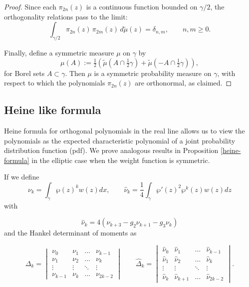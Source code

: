 \documentclass[11pt,a4paper]{article}
\theoremstyle{definition}
\numberwithin{equation}{section}
\numberwithin{theorem}{section}
\newcommand{\myrmk}[2]{\begin{quote}\fbox{\begin{minipage}{\linewidth}\small \noindent{\color{red}\bf #2:} #1{\color{red}}\end{minipage}}\end{quote}}
\newcommand{\rmkH}[1]{\myrmk{#1}{HD}}
\newcommand{\rmkS}[1]{\myrmk{#1}{SL}}
\begin{document}
\begin{proof}
Since each \( \pi_{2n}(z) \) is a continuous function bounded on \( \gamma/2 \), the orthogonality relations pass to the limit:
\[
\int_{\gamma/2}  \pi_{2n}(z)\, \pi_{2m}(z) \, d\tilde{\mu}(z) = \delta_{n,m}, \qquad n,m \geq 0.
\]

Finally, define a symmetric measure \( \mu \) on \( \gamma \) by
\[
\mu(A) := \tfrac{1}{2} \left( \tilde{\mu}(A \cap \tfrac{1}{2}\gamma) + \tilde{\mu}(-A \cap \tfrac{1}{2}\gamma) \right),
\]
for Borel sets \( A \subset \gamma \). Then \( \mu \) is a symmetric probability measure on \( \gamma \), with respect to which the polynomials \( \pi_{2n}(z) \) are orthonormal, as claimed.
\end{proof}






\subsection{Heine like formula}\label{subsec:Heine-even}
{Heine formula \cite{Van_Assche_2020} for orthogonal polynomials in the real line allows us to view the polynomials as the expected characteristic polynomial of a joint probability distribution function (pdf). We prove analogous results in Proposition \ref{heine-formula} in the elliptic case when the weight function is symmetric.}

If we define 
\begin{equation}
    \nu_{k}=\int_{\gamma}\wp(z)^kw(z)dx, \qquad \widehat{\nu}_{k}=\frac{1}{4}\int_{\gamma}\wp'(z)^2\wp^{k}(z)w(z)dz
\end{equation}
with 

\begin{equation}
    \widehat{\nu}_k=4(\nu_{k+3}-g_2\nu_{k+1}-g_3\nu_{k})
\end{equation}
and the Hankel determinant of moments as 

\begin{equation}
    \Delta_{k}=\begin{vmatrix}
        \nu_0&\nu_1&\dots &\nu_{k-1}\\
        \nu_1&\nu_2&\dots& \nu_{k}\\
        \vdots&\vdots&\ddots&\vdots\\
        \nu_{k-1}&\nu_{k}&\dots & \nu_{2k-2}
    \end{vmatrix}\qquad     \widehat{\Delta}_{k}=\begin{vmatrix}
       \widehat{\nu}_0&\widehat{\nu}_1&\dots &\widehat{\nu}_{k-1}\\
        \widehat{\nu}_1&\widehat{\nu}_2&\dots&\widehat{\nu}_{k}\\
        \vdots&\vdots&\ddots&\vdots\\
        \widehat{\nu}_{k}&\widehat{\nu}_{k+1}&\dots &\widehat{\nu}_{2k-2}
    \end{vmatrix}.
\end{equation}
\end{document}
